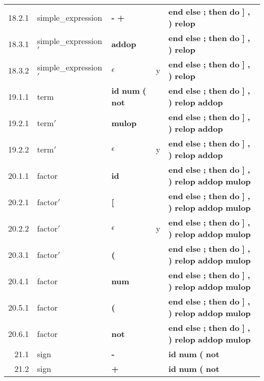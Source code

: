 \begin{center}
\begin{tabular}{rllll}
18.2.1 & simple\_expression & \textbf{-} \textbf{+} &  & \textbf{end} \textbf{else} \textbf{;} \textbf{then} \textbf{do} \textbf{]} \textbf{,} \textbf{)} \textbf{relop}\\
18.3.1 & simple\_expression$\prime$ & \textbf{addop} &  & \textbf{end} \textbf{else} \textbf{;} \textbf{then} \textbf{do} \textbf{]} \textbf{,} \textbf{)} \textbf{relop}\\
18.3.2 & simple\_expression$\prime$ & $\epsilon$ & y & \textbf{end} \textbf{else} \textbf{;} \textbf{then} \textbf{do} \textbf{]} \textbf{,} \textbf{)} \textbf{relop}\\
19.1.1 & term & \textbf{id} \textbf{num} \textbf{(} \textbf{not} &  & \textbf{end} \textbf{else} \textbf{;} \textbf{then} \textbf{do} \textbf{]} \textbf{,} \textbf{)} \textbf{relop} \textbf{addop}\\
19.2.1 & term$\prime$ & \textbf{mulop} &  & \textbf{end} \textbf{else} \textbf{;} \textbf{then} \textbf{do} \textbf{]} \textbf{,} \textbf{)} \textbf{relop} \textbf{addop}\\
19.2.2 & term$\prime$ & $\epsilon$ & y & \textbf{end} \textbf{else} \textbf{;} \textbf{then} \textbf{do} \textbf{]} \textbf{,} \textbf{)} \textbf{relop} \textbf{addop}\\
20.1.1 & factor & \textbf{id} &  & \textbf{end} \textbf{else} \textbf{;} \textbf{then} \textbf{do} \textbf{]} \textbf{,} \textbf{)} \textbf{relop} \textbf{addop} \textbf{mulop}\\
20.2.1 & factor$\prime$ & \textbf{[} &  & \textbf{end} \textbf{else} \textbf{;} \textbf{then} \textbf{do} \textbf{]} \textbf{,} \textbf{)} \textbf{relop} \textbf{addop} \textbf{mulop}\\
20.2.2 & factor$\prime$ & $\epsilon$ & y & \textbf{end} \textbf{else} \textbf{;} \textbf{then} \textbf{do} \textbf{]} \textbf{,} \textbf{)} \textbf{relop} \textbf{addop} \textbf{mulop}\\
20.3.1 & factor$\prime$ & \textbf{(} &  & \textbf{end} \textbf{else} \textbf{;} \textbf{then} \textbf{do} \textbf{]} \textbf{,} \textbf{)} \textbf{relop} \textbf{addop} \textbf{mulop}\\
20.4.1 & factor & \textbf{num} &  & \textbf{end} \textbf{else} \textbf{;} \textbf{then} \textbf{do} \textbf{]} \textbf{,} \textbf{)} \textbf{relop} \textbf{addop} \textbf{mulop}\\
20.5.1 & factor & \textbf{(} &  & \textbf{end} \textbf{else} \textbf{;} \textbf{then} \textbf{do} \textbf{]} \textbf{,} \textbf{)} \textbf{relop} \textbf{addop} \textbf{mulop}\\
20.6.1 & factor & \textbf{not} &  & \textbf{end} \textbf{else} \textbf{;} \textbf{then} \textbf{do} \textbf{]} \textbf{,} \textbf{)} \textbf{relop} \textbf{addop} \textbf{mulop}\\
21.1 & sign & \textbf{-} &  & \textbf{id} \textbf{num} \textbf{(} \textbf{not}\\
21.2 & sign & \textbf{+} &  & \textbf{id} \textbf{num} \textbf{(} \textbf{not}\\
\end{tabular}
\end{center}
%